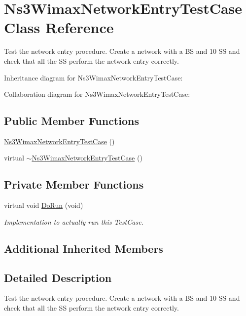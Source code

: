 \hypertarget{classNs3WimaxNetworkEntryTestCase}{}\section{Ns3\+Wimax\+Network\+Entry\+Test\+Case Class Reference}
\label{classNs3WimaxNetworkEntryTestCase}


Test the network entry procedure. Create a network with a BS and 10 SS and check that all the SS perform the network entry correctly.  




Inheritance diagram for Ns3\+Wimax\+Network\+Entry\+Test\+Case\+:


Collaboration diagram for Ns3\+Wimax\+Network\+Entry\+Test\+Case\+:
\subsection*{Public Member Functions}
\begin{DoxyCompactItemize}
\item 
\hyperlink{classNs3WimaxNetworkEntryTestCase_add7558628d5497d4429245427f62d880}{Ns3\+Wimax\+Network\+Entry\+Test\+Case} ()
\item 
virtual \hyperlink{classNs3WimaxNetworkEntryTestCase_af251e2193b2a39230f30d7cd5dabccf9}{$\sim$\+Ns3\+Wimax\+Network\+Entry\+Test\+Case} ()
\end{DoxyCompactItemize}
\subsection*{Private Member Functions}
\begin{DoxyCompactItemize}
\item 
virtual void \hyperlink{classNs3WimaxNetworkEntryTestCase_a61eddac90aec6c495395338ee412bb09}{Do\+Run} (void)
\begin{DoxyCompactList}\small\item\em Implementation to actually run this Test\+Case. \end{DoxyCompactList}\end{DoxyCompactItemize}
\subsection*{Additional Inherited Members}


\subsection{Detailed Description}
Test the network entry procedure. Create a network with a BS and 10 SS and check that all the SS perform the network entry correctly. 

